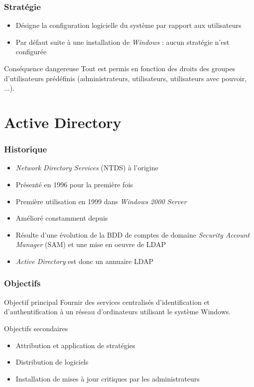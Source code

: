 \documentclass{beamer}
\begin{document}
  \begin{frame}
     \frametitle{Stratégie}
    \begin{itemize}
     \item Désigne la configuration logicielle du système par rapport aux utilisateurs
     \item Par défaut suite à une installation de \textit{Windows} : aucun stratégie n'est configurée
    \end{itemize}
    \begin{alertblock}{Conséquence dangereuse}
     Tout est permis en fonction des droits des groupes d'utilisateurs prédéfinis (administrateurs, utilisateurs, utilisateurs avec pouvoir, ...).
    \end{alertblock}
  \end{frame}
  
  \section{Active Directory}
  \begin{frame}
    \frametitle{Historique}
    \begin{itemize}
     \item \textit{Network Directory Services} (NTDS) à l'origine
     \item Présenté en 1996 pour la première fois
     \item Première utilisation en 1999 dans \textit{Windows 2000 Server}
     \item Amélioré constamment depuis
     \item Résulte d'une évolution de la BDD de comptes de domaine \textit{Security Account Manager} (SAM) et une mise en oeuvre de LDAP
     \item \textit{Active Directory} est donc un annuaire LDAP
    \end{itemize}
  \end{frame}
  
  \begin{frame}
    \frametitle{Objectifs}
    \begin{block}{Objectif principal}
     Fournir des services centralisés d'identification et d'authentification à un réseau d'ordinateurs utilisant le système Windows.
    \end{block}
    \begin{block}{Objectifs secondaires}
     \begin{itemize}
      \item Attribution et application de stratégies
      \item Distribution de logiciels
      \item Installation de mises à jour critiques par les administrateurs
     \end{itemize}
    \end{block}
  \end{frame}
  
\end{document}
